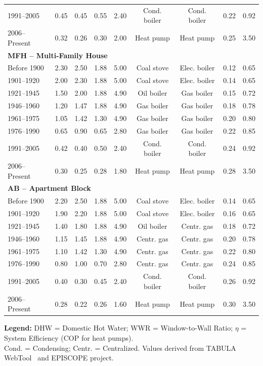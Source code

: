 \begin{table}[htbp]
\begin{tabular}{l|cccc|cccc}
1991--2005 & 0.45 & 0.45 & 0.55 & 2.40 & Cond. boiler & Cond. boiler & 0.22 & 0.92 \\
2006--Present & 0.32 & 0.26 & 0.30 & 2.00 & Heat pump & Heat pump & 0.25 & 3.50 \\
\midrule
\multicolumn{9}{l}{\textbf{MFH -- Multi-Family House}} \\
\midrule
Before 1900 & 2.30 & 2.50 & 1.88 & 5.00 & Coal stove & Elec. boiler & 0.12 & 0.65 \\
1901--1920 & 2.00 & 2.30 & 1.88 & 5.00 & Coal stove & Elec. boiler & 0.14 & 0.65 \\
1921--1945 & 1.50 & 2.00 & 1.88 & 4.90 & Oil boiler & Gas boiler & 0.15 & 0.72 \\
1946--1960 & 1.20 & 1.47 & 1.88 & 4.90 & Gas boiler & Gas boiler & 0.18 & 0.78 \\
1961--1975 & 1.05 & 1.42 & 1.30 & 4.90 & Gas boiler & Gas boiler & 0.20 & 0.80 \\
1976--1990 & 0.65 & 0.90 & 0.65 & 2.80 & Gas boiler & Gas boiler & 0.22 & 0.85 \\
1991--2005 & 0.42 & 0.40 & 0.50 & 2.40 & Cond. boiler & Cond. boiler & 0.24 & 0.92 \\
2006--Present & 0.30 & 0.25 & 0.28 & 1.80 & Heat pump & Heat pump & 0.28 & 3.50 \\
\midrule
\multicolumn{9}{l}{\textbf{AB -- Apartment Block}} \\
\midrule
Before 1900 & 2.20 & 2.50 & 1.88 & 5.00 & Coal stove & Elec. boiler & 0.14 & 0.65 \\
1901--1920 & 1.90 & 2.20 & 1.88 & 5.00 & Coal stove & Elec. boiler & 0.16 & 0.65 \\
1921--1945 & 1.40 & 1.80 & 1.88 & 4.90 & Oil boiler & Centr. gas & 0.18 & 0.72 \\
1946--1960 & 1.15 & 1.45 & 1.88 & 4.90 & Centr. gas & Centr. gas & 0.20 & 0.78 \\
1961--1975 & 1.10 & 1.42 & 1.30 & 4.90 & Centr. gas & Centr. gas & 0.22 & 0.80 \\
1976--1990 & 0.80 & 1.00 & 0.70 & 2.80 & Centr. gas & Centr. gas & 0.24 & 0.85 \\
1991--2005 & 0.40 & 0.30 & 0.45 & 2.40 & Cond. boiler & Cond. boiler & 0.26 & 0.92 \\
2006--Present & 0.28 & 0.22 & 0.26 & 1.60 & Heat pump & Heat pump & 0.30 & 3.50 \\
\bottomrule
\end{tabular}

\vspace{0.2cm}
\footnotesize
\textbf{Legend:} DHW = Domestic Hot Water; WWR = Window-to-Wall Ratio; $\eta$ = System Efficiency (COP for heat pumps).\\
Cond. = Condensing; Centr. = Centralized. Values derived from TABULA WebTool~\cite{tabula-webtool} and EPISCOPE project.
\end{table}

